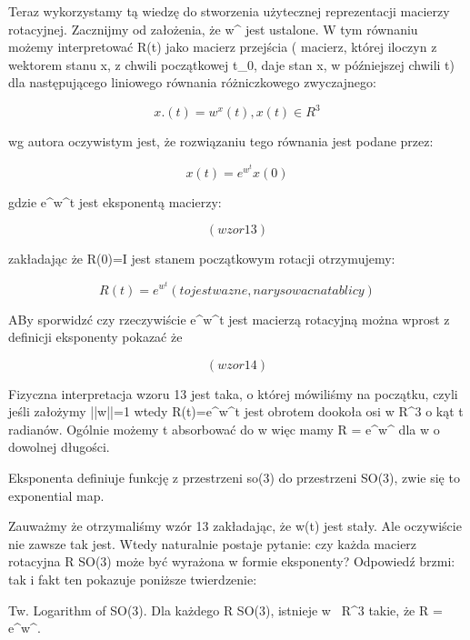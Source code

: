 \documentclass[a4paper,12pt]{article}
\begin{document}
Teraz wykorzystamy tą wiedzę do stworzenia użytecznej reprezentacji macierzy rotacyjnej. Zacznijmy od założenia, że w^ jest ustalone. W tym równaniu możemy interpretować R(t) jako macierz przejścia ( macierz, której iloczyn z wektorem stanu x, z chwili początkowej t_0, daje stan x, w późniejszej chwili t) dla następującego liniowego równania różniczkowego zwyczajnego:

\begin{equation}
x.(t) = w^x(t), x(t) \in R^3
\end{equation}

wg autora oczywistym jest, że rozwiązaniu tego równania jest podane przez:

\begin{equation}
x(t) = e^w^t x(0)
\end{equation}

gdzie e^w^t jest eksponentą macierzy:

\begin{equation}
(wzor 13)
\end{equation}

zakładając że R(0)=I jest stanem początkowym rotacji otrzymujemy:

\begin{equation}
R(t) = e^w^t (to jest wazne, narysowac na tablicy)
\end{equation}

ABy sporwidzć czy rzeczywiście e^w^t jest macierzą rotacyjną można wprost z definicji eksponenty pokazać że

\begin{equation}
(wzor 14)
\end{equation}

Fizyczna interpretacja wzoru 13 jest taka, o której mówiliśmy na początku, czyli jeśli założymy ||w||=1 wtedy R(t)=e^w^t jest obrotem dookoła osi w \in R^3 o kąt t radianów. Ogólnie możemy t absorbować do w więc mamy R = e^w^ dla w o dowolnej długości.

Eksponenta definiuje funkcję z przestrzeni so(3) do przestrzeni SO(3), zwie się to exponential map. 

Zauważmy że otrzymaliśmy wzór 13 zakładając, że w(t) jest stały. Ale oczywiście nie zawsze tak jest. Wtedy naturalnie postaje pytanie: czy każda macierz rotacyjna R \in SO(3) może być wyrażona w formie eksponenty? Odpowiedź brzmi: tak i fakt ten pokazuje poniższe twierdzenie:

Tw. Logarithm of SO(3). Dla każdego R \in SO(3), istnieje w \ R^3 takie, że R = e^w^. 
\end{document}
